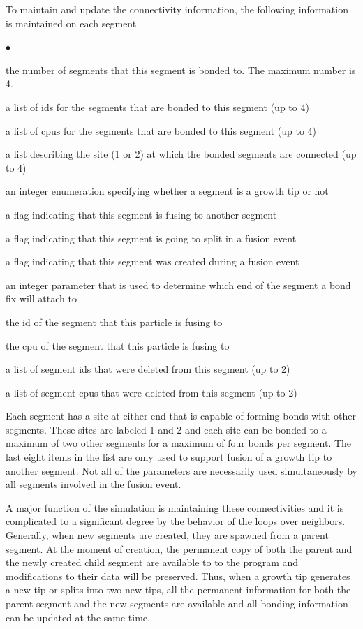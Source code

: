 \documentclass[12pt]{article}
\begin{document}
To maintain and update the connectivity information, the following information is maintained
on each segment
\begin{list}{$\bullet$}{}
\item the number of segments that this segment is bonded to. The maximum number is 4.
\item a list of ids for the segments that are bonded to this segment (up to 4)
\item a list of cpus for the segments that are bonded to this segment (up to 4)
\item a list describing the site (1 or 2) at which the bonded segments are connected (up to 4)
\item an integer enumeration specifying whether a segment is a growth tip or not
\item a flag indicating that this segment is fusing to another segment
\item a flag indicating that this segment is going to split in a fusion event
\item a flag indicating that this segment was created during a fusion event
\item an integer parameter that is used to determine which end of the segment a bond fix will
attach to
\item the id of the segment that this particle is fusing to
\item the cpu of the segment that this particle is fusing to
\item a list of segment ids that were deleted from this segment (up to 2)
\item a list of segment cpus that were deleted from this segment (up to 2)
\end{list}
Each segment has a site at either end that is capable of forming bonds with other segments.
These sites are labeled 1 and 2 and each site can be bonded to a maximum of two other segments
for a maximum of four bonds per segment. The last eight items in the list are only used to
support fusion of a growth tip to another segment. Not all of the parameters are necessarily
used simultaneously by all segments involved in the fusion event.

A major function of the simulation is maintaining these connectivities and it is complicated
to a significant degree by the behavior of the loops over neighbors. Generally, when new
segments are created, they are spawned from a parent segment. At the moment of creation,
the permanent copy of both the parent and the newly created child segment are available to
to the program and modifications to their data will be preserved. Thus, when a growth tip
generates a new tip or splits into two new tips, all the permanent information for both the
parent segment and the new segments are available and all bonding information can be updated
at the same time.
\end{document}
